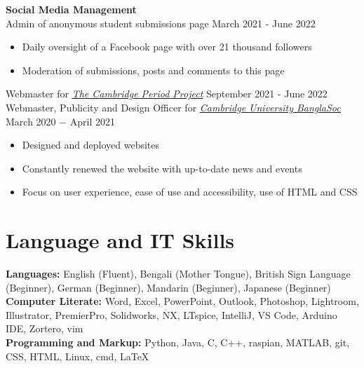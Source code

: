 \documentclass{article}
\begin{document}
\textbf{Social Media Management}\\
Admin of anonymous student submissions page \hfill March 2021 - June 2022
\begin{itemize}
    \item Daily oversight of a Facebook page with over 21 thousand followers
    \item Moderation of submissions, posts and comments to this page
\end{itemize}
Webmaster for \href{http://tcpp.soc.srcf.net/}{\underline{\textit{The Cambridge Period Project}}} \hfill September 2021 - June 2022\\ 
Webmaster, Publicity and Design Officer for \href{https://cambridgebanglasoc.org/}{\underline{\textit{Cambridge University BanglaSoc}}} \hfill March 2020 $-$ April 2021
\begin{itemize}
    \item Designed and deployed websites
    \item Constantly renewed the website with up-to-date news and events 
    \item Focus on user experience, ease of use and accessibility, use of HTML and CSS
\end{itemize} \medskip

\vspace{-.5\baselineskip}
\hrulefill
\vspace{-.5\baselineskip}

\section*{Language and IT Skills}
\textbf{Languages:} English (Fluent), Bengali (Mother Tongue), British Sign Language (Beginner), German (Beginner), Mandarin (Beginner), Japanese (Beginner) \\
\textbf{Computer Literate:} Word, Excel, PowerPoint, Outlook, Photoshop, Lightroom, Illustrator, PremierPro, Solidworks, NX, LTspice, IntelliJ, VS Code, Arduino IDE, Zortero, vim\\
\textbf{Programming and Markup:} Python, Java, C, C++, raspian, MATLAB, git, CSS, HTML, Linux, cmd, \LaTeX \medskip

\vspace{-.5\baselineskip}
\hrulefill
\vspace{-.5\baselineskip}
\end{document}
